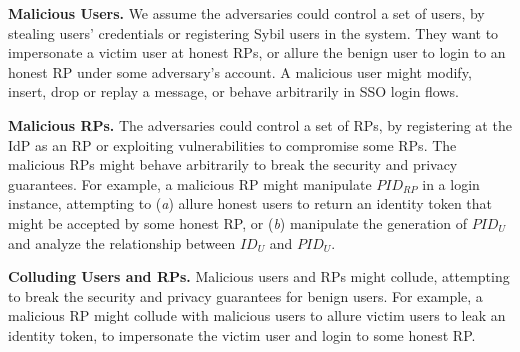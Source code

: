 \noindent \textbf{Malicious Users.}
We assume the adversaries could control a set of users,
 by stealing users' credentials or registering Sybil users in the system.
They want to impersonate a victim user at honest RPs, or allure the benign user to login to an honest RP under some adversary's account.
A malicious user might
    modify, insert, drop or replay a message, or behave arbitrarily in SSO login flows.



\noindent \textbf{Malicious RPs.}
The adversaries could control a set of RPs, by registering at the IdP as an RP
     or exploiting vulnerabilities to compromise some RPs.
The malicious RPs might behave arbitrarily to break the security and privacy guarantees.
For example,
a malicious RP might manipulate $PID_{RP}$ in a login instance,
    attempting to (\emph{a}) allure honest users to return an identity token that might be accepted by some honest RP,
or (\emph{b}) manipulate the generation of $PID_U$ and
    analyze the relationship between $ID_U$ and $PID_U$.


\noindent \textbf{Colluding Users and RPs.}
Malicious users and RPs might collude,
 attempting to break the security and privacy guarantees for benign users.
For example, a malicious RP might collude with malicious users to allure victim users to leak an identity token,
    to impersonate the victim user and login to some honest RP.

